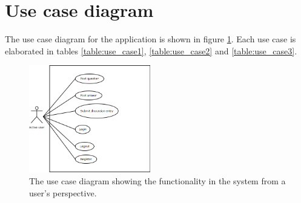 





\section{Use case diagram}\label{section:usecase}

The use case diagram for the application is shown in  figure \ref{figure:use_case_diagram}. Each use case is elaborated in tables \ref{table:use_case1}, \ref{table:use_case2} and \ref{table:use_case3}.

\begin{figure}
	\begin{center}
		\includegraphics[width=200px]{img/use_case_diagram}
	\end{center}
	\caption{The use case diagram showing the functionality in the system from a user's perspective.}
	\label{figure:use_case_diagram}
\end{figure}


